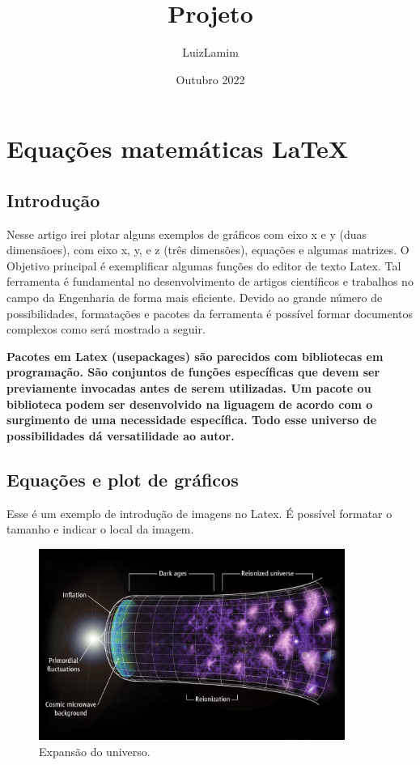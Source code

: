 \documentclass[a4paper,12pt]{article}
\title{Projeto}
\author{LuizLamim}
\date{Outubro 2022}
\begin{document}
\maketitle

\section{Equações matemáticas LaTeX}
\subsection{Introdução}
    Nesse artigo irei plotar alguns exemplos de gráficos com eixo x e y (duas dimensãoes), com eixo
x, y, e z (três dimensões), equações e algumas matrizes. O Objetivo principal é exemplificar algumas
funções do editor de texto Latex. Tal ferramenta é fundamental no desenvolvimento de 
artigos científicos e trabalhos no campo da Engenharia de forma mais eficiente. Devido ao grande
número de possibilidades, formatações e pacotes da ferramenta é possível formar documentos complexos como será
mostrado a seguir. 

\begin{center}
\textbf{   Pacotes em Latex (usepackages) são parecidos com bibliotecas em programação. 
    São conjuntos de funções específicas que devem ser previamente invocadas antes de serem utilizadas. 
    Um pacote ou biblioteca podem ser desenvolvido na liguagem de acordo com o surgimento de uma necessidade
    específica. Todo esse universo de possibilidades dá versatilidade ao autor. }
\end{center}

\subsection{Equações e plot de gráficos}

Esse é um exemplo de introdução de imagens no Latex. É possível formatar o tamanho e indicar o local 
da imagem.

\begin{figure}[ht]
\centering
\includegraphics[width=10cm]{figuras/bigbang.jpeg}
\caption{Expansão do universo.}
\label{fig01}
\end{figure}

\newpage
{}
\headcm \todayr
\end{document}
